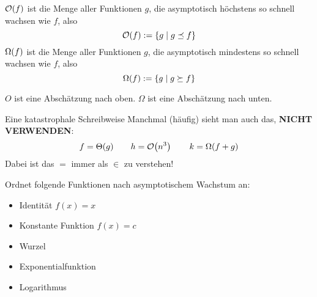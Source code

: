 \begin{frame}[t]{} %
	\begin{Definition}
		$\mathcal{O}\!\left(f\right)$ ist die Menge aller Funktionen $g$, die asymptotisch höchstens so schnell wachsen wie $f$, also $$\mathcal{O}\!\left(f\right) := \{ g \mid g \preceq f \}$$
		$\Omega\!\left(f\right)$ ist die Menge aller Funktionen $g$, die asymptotisch mindestens so schnell wachsen wie $f$, also $$\Omega\!\left(f\right) := \{ g \mid g \succeq f \}$$
	\end{Definition} \pause
	\impl $O$ ist eine Abschätzung nach oben. $\Omega$ ist eine Abschätzung nach unten.
\end{frame}




\begin{frame}{Eine katastrophale Schreibweise}
	Manchmal (häufig) sieht man auch das, \textbf{NICHT VERWENDEN}:
	$$f = \Theta(g) \qquad h = \mathcal{O}\!\left(n^3\right) \qquad k = \Omega(f + g)$$
	\pause
	Dabei ist das $=$ immer als $\in$ zu verstehen!
\end{frame}

\begin{frame}{}
	Ordnet folgende Funktionen nach asymptotischem Wachstum an:
	\begin{itemize}
		\item Identität $f(x) = x$
		\item Konstante Funktion $f(x) = c$
		\item Wurzel
		\item Exponentialfunktion
		\item Logarithmus
	\end{itemize}
\end{frame}




